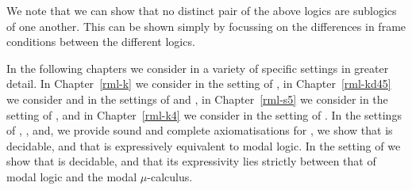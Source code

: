 We note that we can show that no distinct pair of the above logics are sublogics of one another.
This can be shown simply by focussing on the differences in frame conditions between the different logics.

In the following chapters we consider \logicRml{} in a variety of specific settings in greater detail.
In Chapter~\ref{rml-k} we consider \logicRmlK{} in the setting of \classK{}, in Chapter~\ref{rml-kd45} we consider \logicRmlKFF{} and \logicRmlKD{} in the settings of \classKFF{} and \classKD{}, in Chapter~\ref{rml-s5} we consider \logicRmlS{} in the setting of \classS{}, and in Chapter~\ref{rml-k4} we consider \logicRmlKF{} in the setting of \classKF{}.
In the settings of \classK{}, \classKFF{}, \classKD{} and, \classS{} we provide sound and complete axiomatisations for \logicRml{}, we show that \logicRml{} is decidable, and that \logicRml{} is expressively equivalent to modal logic.
In the setting of \classKF{} we show that \logicRml{} is decidable, and that its expressivity lies strictly between that of modal logic and the modal $\mu$-calculus.
